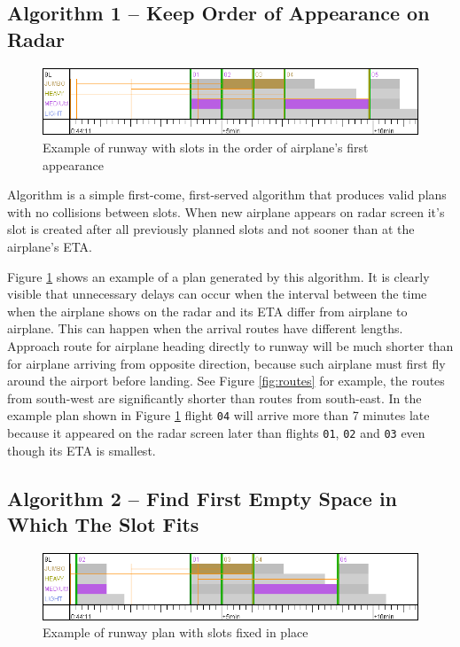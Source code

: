 \subsection{Algorithm 1 – Keep Order of Appearance on Radar}

\begin{figure}[h]
    \centering
    \includegraphics[width=\textwidth]{figures/rwy-end.png}
    \caption{Example of runway with slots in the order of airplane's first appearance}
    \label{fig:rwy-end}
\end{figure}

Algorithm is a simple first-come, first-served algorithm that produces valid plans with no collisions between slots. When new airplane appears on radar screen it's slot is created after all previously planned slots and not sooner than at the airplane's ETA.

Figure \ref{fig:rwy-end} shows an example of a plan generated by this algorithm. It is clearly visible that unnecessary delays can occur when the interval between the time when the airplane shows on the radar and its ETA differ from airplane to airplane. This can happen when the arrival routes have different lengths. Approach route for airplane heading directly to runway will be much shorter than for airplane arriving from opposite direction, because such airplane must first fly around the airport before landing. See Figure \ref{fig:routes} for example, the routes from south-west are significantly shorter than routes from south-east. In the example plan shown in Figure \ref{fig:rwy-end} flight \texttt{04} will arrive more than 7 minutes late because it appeared on the radar screen later than flights \texttt{01}, \texttt{02} and \texttt{03} even though its ETA is smallest.

\subsection{Algorithm 2 – Find First Empty Space in Which The Slot Fits}

\begin{figure}[h]
    \centering
    \includegraphics[width=\textwidth]{figures/rwy-fill-voids.png}
    \caption{Example of runway plan with slots fixed in place}
    \label{fig:rwy-fill-voids}
\end{figure}

